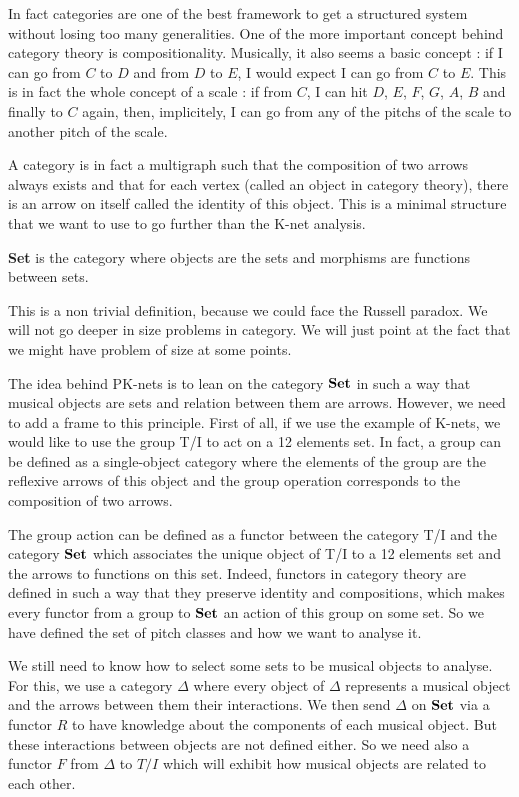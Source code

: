 In fact categories are one of the best framework to get a structured system without losing too many generalities.
One of the more important concept behind category theory is compositionality. Musically, it also seems a basic concept : if I can go from $C$ to $D$ and from $D$ to $E$, I would expect I can go from $C$ to $E$. This is in fact the whole concept of a scale : if from $C$, I can hit $D$, $E$, $F$, $G$, $A$, $B$ and finally to $C$ again, then, implicitely, I can go from any of the pitchs of the scale to another pitch of the scale.

A category is in fact a multigraph such that the composition of two arrows always exists and that for each vertex (called an object in category theory), there is an arrow on itself called the identity of this object. This is a minimal structure that we want to use to go further than the K-net analysis.

\begin{defn}\textbf{Set}\label{nomencl:Set} is the category where objects are the sets and morphisms are functions between sets.
\end{defn}

This is a non trivial definition, because we could face the Russell paradox. We will not go deeper in size problems in category. We will just point at the fact that we might have problem of size at some points.


The idea behind PK-nets is to lean on the category $\bf Set$ in such a way that musical objects are sets and relation between them are arrows. However, we need to add a frame to this principle. First of all, if we use the example of K-nets, we would like to use the group T/I to act on a 12 elements set. In fact, a group can be defined as a single-object category where the elements of the group are the reflexive arrows of this object and the group operation corresponds to the composition of two arrows.

The group action can be defined as a functor between the category T/I and the category $\bf Set$ which associates the unique object of T/I to a 12 elements set and the arrows to functions on this set. Indeed, functors in category theory are defined in such a way that they preserve identity and compositions, which makes every functor from a group to $\bf Set$ an action of this group on some set. So we have defined the set of pitch classes and how we want to analyse it.

We still need to know how to select some sets to be musical objects to analyse. For this, we use a category $\Delta$ where every object of $\Delta$ represents a musical object and the arrows between them their interactions. We then send  $\Delta$ on $\bf Set$ via a functor $R$ to have knowledge about the components of each musical object. But these interactions between objects are not defined either. So we need also a functor $F$ from $\Delta$ to $T/I$ which will exhibit how musical objects are related to each other.


